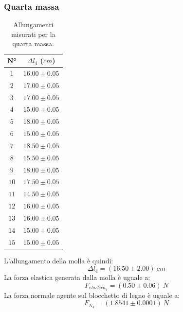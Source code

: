 \documentclass[11pt]{article}
\begin{document}
\subsubsection{Quarta massa}
\begin{table}[H]
\centering
\begin{tabular}{|c|c|}
\hline
\textbf{N°} & \textbf{$\Delta l_4$ ($cm$)}\\
\hline
$1$ & $16.00\pm 0.05$ \\
\hline
$2$ & $17.00\pm 0.05$ \\
\hline
$3$ & $17.00\pm 0.05$ \\
\hline
$4$ & $15.00\pm 0.05$ \\
\hline
$5$ & $18.00\pm 0.05$ \\
\hline
$6$ & $15.00\pm 0.05$ \\
\hline
$7$ & $18.50\pm 0.05$ \\
\hline
$8$ & $15.50\pm 0.05$ \\
\hline
$9$ & $18.00\pm 0.05$ \\
\hline
$10$ & $17.50\pm 0.05$ \\
\hline
$11$ & $14.50\pm 0.05$ \\
\hline
$12$ & $16.00\pm 0.05$ \\
\hline
$13$ & $16.00\pm 0.05$ \\
\hline
$14$ & $15.00\pm 0.05$ \\
\hline
$15$ & $15.00\pm 0.05$ \\
\hline
\end{tabular}
\caption{Allungamenti misurati per la quarta massa.}
\label{tab:}
\end{table}
L'allungamento della molla è quindi:
\begin{equation}
    \Delta l_4=(16.50\pm 2.00)\ cm
\end{equation}
La forza elastica generata dalla molla è uguale a:
\begin{equation}
    F_{elastica_4} = (0.50\pm 0.06)\ N
\end{equation}
La forza normale agente sul blocchetto di legno è uguale a:
\begin{equation}
    F_{N_4} = (1.8541\pm 0.0001)\ N
\end{equation}
\end{document}
